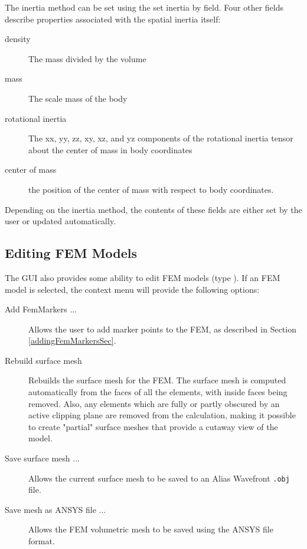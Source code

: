 \documentclass{article}
\begin{document}
The inertia method can be set using the {\sf set inertia by} field.  Four
other fields describe properties associated with the spatial inertia
itself: 

\begin{description}

\item[density]\mbox{}

The mass divided by the volume

\item[mass]\mbox{}

The scale mass of the body

\item[rotational inertia]\mbox{}

The xx, yy, zz, xy, xz, and yz components of the
rotational inertia tensor about the center of mass in body
coordinates

\item[center of mass]\mbox{}

the position of the center of mass
with respect to body coordinates.

\end{description}

Depending on the inertia method, the contents of these fields are
either set by the user or updated automatically.

\subsection{Editing FEM Models}

The GUI also provides some ability to edit FEM models
(type ).
If an FEM
model is selected, the context menu will provide the following
options:

\begin{description}

\item[Add FemMarkers ...]\mbox{}

Allows the user to add marker points to the FEM, as described in
Section \ref{addingFemMarkersSec}.

\item[Rebuild surface mesh]\mbox{}
 Rebuilds the surface mesh for the FEM. The
surface mesh is computed automatically from the faces of all the
elements, with inside faces being removed. Also, any elements which
are fully or partly obscured by an active clipping plane are removed
from the calculation, making it possible to create "partial" surface
meshes that provide a cutaway view of the model.

\item[Save surface mesh ...]\mbox{}

Allows the current surface mesh to be saved to an Alias Wavefront {\tt .obj} file.

\item[Save mesh as ANSYS file ...]\mbox{}

Allows the FEM volumetric mesh to be saved using the ANSYS file format.

\end{description}
\end{document}
